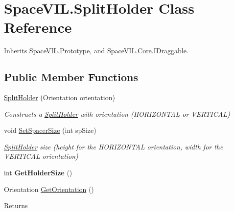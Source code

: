 \hypertarget{class_space_v_i_l_1_1_split_holder}{}\section{Space\+V\+I\+L.\+Split\+Holder Class Reference}
\label{class_space_v_i_l_1_1_split_holder}


Inherits \mbox{\hyperlink{class_space_v_i_l_1_1_prototype}{Space\+V\+I\+L.\+Prototype}}, and \mbox{\hyperlink{interface_space_v_i_l_1_1_core_1_1_i_draggable}{Space\+V\+I\+L.\+Core.\+I\+Draggable}}.

\subsection*{Public Member Functions}
\begin{DoxyCompactItemize}
\item 
\mbox{\hyperlink{class_space_v_i_l_1_1_split_holder_ae6b6eb9d5aaec2d342060ff43161c828}{Split\+Holder}} (Orientation orientation)
\begin{DoxyCompactList}\small\item\em Constructs a \mbox{\hyperlink{class_space_v_i_l_1_1_split_holder}{Split\+Holder}} with orientation (H\+O\+R\+I\+Z\+O\+N\+T\+AL or V\+E\+R\+T\+I\+C\+AL) \end{DoxyCompactList}\item 
void \mbox{\hyperlink{class_space_v_i_l_1_1_split_holder_a62cde28681c0be51120e07724db4486b}{Set\+Spacer\+Size}} (int sp\+Size)
\begin{DoxyCompactList}\small\item\em \mbox{\hyperlink{class_space_v_i_l_1_1_split_holder}{Split\+Holder}} size (height for the H\+O\+R\+I\+Z\+O\+N\+T\+AL orientation, width for the V\+E\+R\+T\+I\+C\+AL orientation) \end{DoxyCompactList}\item 
\mbox{\label{class_space_v_i_l_1_1_split_holder_a023beddef2f5f0a94acb8848863df67a}} 
int {\bfseries Get\+Holder\+Size} ()
\item 
\mbox{\label{class_space_v_i_l_1_1_split_holder_ab6bd818ebb9c04889fd9e5e18262015c}} 
Orientation \mbox{\hyperlink{class_space_v_i_l_1_1_split_holder_ab6bd818ebb9c04889fd9e5e18262015c}{Get\+Orientation}} ()
\begin{DoxyCompactList}\small\item\em \begin{DoxyReturn}{Returns}

\end{DoxyReturn}
\end{DoxyCompactList}
\end{DoxyCompactItemize}
